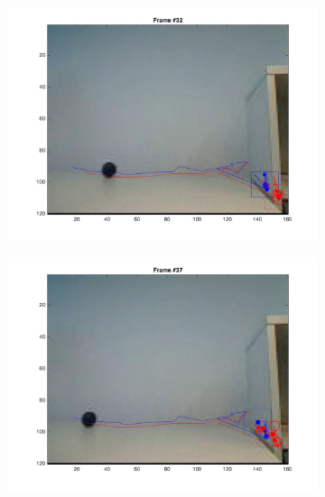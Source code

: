 \documentclass{ethz_report}
\begin{document}
\begin{figure}[h]
\begin{subfigure}[b]{.25\textwidth}
        \includegraphics[width=1\linewidth]{images/video3_noise_high_31}
    \end{subfigure}%
    \begin{subfigure}[b]{.25\textwidth}
        \centering
        \includegraphics[width=1\linewidth]{images/video3_noise_high_36}
    \end{subfigure}
    \begin{subfigure}[b]{.25\textwidth}
        \centering

\end{subfigure}
\end{figure}
\end{document}
